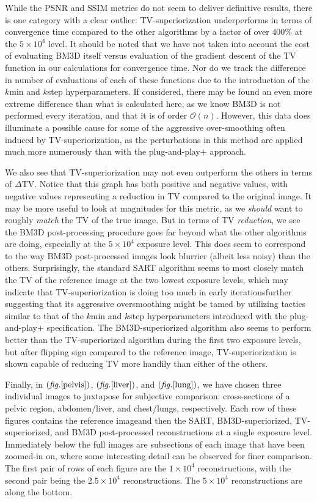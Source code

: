 \documentclass[sigconf,twocolumn,nonacm=true]{acmart}
\newcommand{\emd}{\text{\textemdash}} %
\newcommand{\e}[1]{\times10^{#1}} %
\newcommand{\enc}[1]{\left( #1 \right)} %
\newcommand{\bigo}[1]{\mathscr{O}\enc{#1}} %
\newcommand{\fig}[1]{$\enc{\textit{fig.}\ref{#1}}$}
\begin{document}
While the PSNR and SSIM metrics do not seem to deliver definitive results, there is one category with a clear outlier: TV-superiorization underperforms in terms of convergence time compared to the other algorithms by a factor of over $400\%$ at the $5\e{4}$ level. It should be noted that we have not taken into account the cost of evaluating BM3D itself versus evaluation of the gradient descent of the TV function in our calculations for convergence time. Nor do we track the difference in number of evaluations of each of these functions due to the introduction of the $k$min and $k$step hyperparameters. If considered, there may be found an even more extreme difference than what is calculated here, as we know BM3D is not performed every iteration, and that it is of order $\bigo{n}$. However, this data does illuminate a possible cause for some of the aggressive over-smoothing often induced by TV-superiorization, as the perturbations in this method are applied much more numerously than with the plug-and-play+ approach.

We also see that TV-superiorization may not even outperform the others in terms of $\Delta$TV. Notice that this graph has both positive and negative values, with negative values representing a reduction in TV compared to the original image. It may be more useful to look at magnitudes for this metric, as we \textit{should} want to roughly \textit{match} the TV of the true image. But in terms of TV \textit{reduction}, we see the BM3D post-processing procedure goes far beyond what the other algorithms are doing, especially at the $5\e{4}$ exposure level. This does seem to correspond to the way BM3D post-processed images look blurrier (albeit less noisy) than the others. Surprisingly, the standard SART algorithm seems to most closely match the TV of the reference image at the two lowest exposure levels, which may indicate that TV-superiorization is doing too much in early iterations\emd further suggesting that its aggressive oversmoothing might be tamed by utilizing tactics similar to that of the $k$min and $k$step hyperparameters introduced with the plug-and-play+ specification. The BM3D-superiorized algorithm also seems to perform better than the TV-superiorized algorithm during the first two exposure levels, but after flipping sign compared to the reference image, TV-superiorization is shown capable of reducing TV more handily than either of the others.

Finally, in \fig{pelvis}, \fig{liver}, and \fig{lung}, we have chosen three individual images to juxtapose for subjective comparison: cross-sections of a pelvic region, abdomen/liver, and chest/lungs, respectively. Each row of these figures contains the reference image\emd and then the SART, BM3D-superiorized, TV-superiorized, and BM3D post-processed reconstructions at a single exposure level. Immediately below the full images are subsections of each image that have been zoomed-in on, where some interesting detail can be observed for finer comparison. The first pair of rows of each figure are the $1\e{4}$ reconstructions, with the second pair being the $2.5\e{4}$ reconstructions. The $5\e{4}$ reconstructions are along the bottom.
\end{document}
